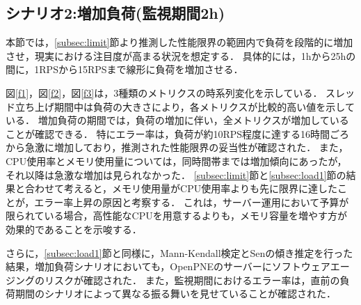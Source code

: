 \documentclass[twoside,twocolumn,10pt]{jarticle}  %
\begin{document}
\subsection{シナリオ2:増加負荷(監視期間2h)}\label{subsec:load2}

本節では，\ref{subsec:limit}節より推測した性能限界の範囲内で負荷を段階的に増加させ，現実における注目度が高まる状況を想定する．
具体的には，1hから25hの間に，1RPSから15RPSまで線形に負荷を増加させる．

図\ref{f1}，図\ref{f2}，図\ref{f3}は，3種類のメトリクスの時系列変化を示している．
スレッド立ち上げ期間中は負荷の大きさにより，各メトリクスが比較的高い値を示している．
増加負荷の期間では，負荷の増加に伴い，全メトリクスが増加していることが確認できる．
特にエラー率は，負荷が約10RPS程度に達する16時間ごろから急激に増加しており，推測された性能限界の妥当性が確認された．
また，CPU使用率とメモリ使用量については，同時間帯までは増加傾向にあったが，それ以降は急激な増加は見られなかった．
\ref{subsec:limit}節と\ref{subsec:load1}節の結果と合わせて考えると，メモリ使用量がCPU使用率よりも先に限界に達したことが，エラー率上昇の原因と考察する．
これは，サーバー運用において予算が限られている場合，高性能なCPUを用意するよりも，メモリ容量を増やす方が効果的であることを示唆する．\par
さらに，\ref{subsec:load1}節と同様に，Mann-Kendall検定\cite{Mann1945Nonparametric}とSenの傾き推定\cite{Sen1968Estimates}を行った結果，増加負荷シナリオにおいても，OpenPNEのサーバーにソフトウェアエージングのリスクが確認された．
また，監視期間におけるエラー率は，直前の負荷期間のシナリオによって異なる振る舞いを見せていることが確認された．
\end{document}
